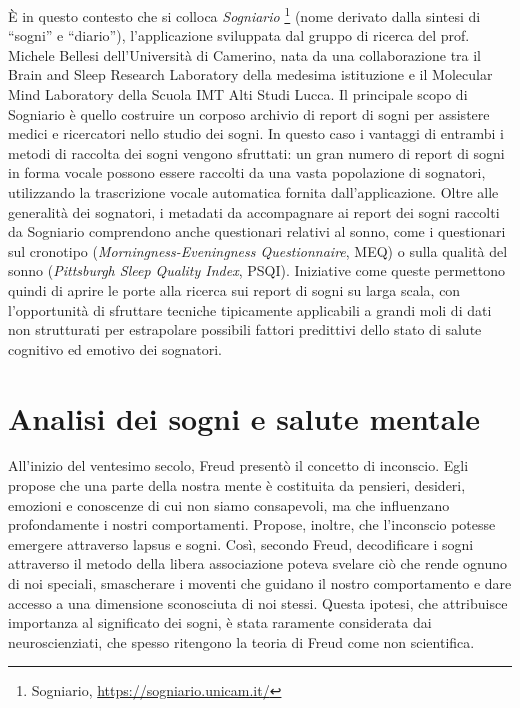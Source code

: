\`E in questo contesto che si colloca \textit{Sogniario} \footnote{Sogniario, \url{https://sogniario.unicam.it/}}
(nome derivato dalla sintesi di ``sogni'' e ``diario''), l'applicazione sviluppata dal gruppo di ricerca del prof.
Michele Bellesi dell'Università di Camerino, nata da una collaborazione tra il Brain and Sleep Research Laboratory
della medesima istituzione e il Molecular Mind Laboratory della Scuola IMT Alti Studi Lucca.
Il principale scopo di Sogniario è quello costruire un corposo archivio di report di sogni per assistere medici e
ricercatori nello studio dei sogni.
In questo caso i vantaggi di entrambi i metodi di raccolta dei sogni vengono sfruttati:
un gran numero di report di sogni in forma vocale possono essere raccolti da una vasta popolazione di sognatori,
utilizzando la trascrizione vocale automatica fornita dall'applicazione.
Oltre alle generalità dei sognatori, i metadati da accompagnare ai report dei sogni raccolti da Sogniario
comprendono anche questionari relativi al sonno, come i questionari sul cronotipo
(\textit{Morningness-Eveningness Questionnaire}, MEQ) o sulla qualità del sonno
(\textit{Pittsburgh Sleep Quality Index}, PSQI).
Iniziative come queste permettono quindi di aprire le porte alla ricerca sui report di sogni su larga scala, con
l'opportunità di sfruttare tecniche tipicamente applicabili a grandi moli di dati non strutturati per
estrapolare possibili fattori predittivi dello stato di salute cognitivo ed emotivo dei sognatori.

\section{Analisi dei sogni e salute mentale}

All'inizio del ventesimo secolo, Freud presentò il concetto di inconscio.
Egli propose che una parte della nostra mente è costituita da pensieri, desideri, emozioni e conoscenze di cui non
siamo consapevoli, ma che influenzano profondamente i nostri comportamenti.
Propose, inoltre, che l'inconscio potesse emergere attraverso lapsus e sogni.
Così, secondo Freud, decodificare i sogni attraverso il metodo della libera associazione poteva
svelare ciò che rende ognuno di noi speciali, smascherare i moventi che guidano il nostro comportamento e
dare accesso a una dimensione sconosciuta di noi stessi.
Questa ipotesi, che attribuisce importanza al significato dei sogni, è stata raramente considerata
dai neuroscienziati, che spesso ritengono la teoria di Freud come non scientifica.

